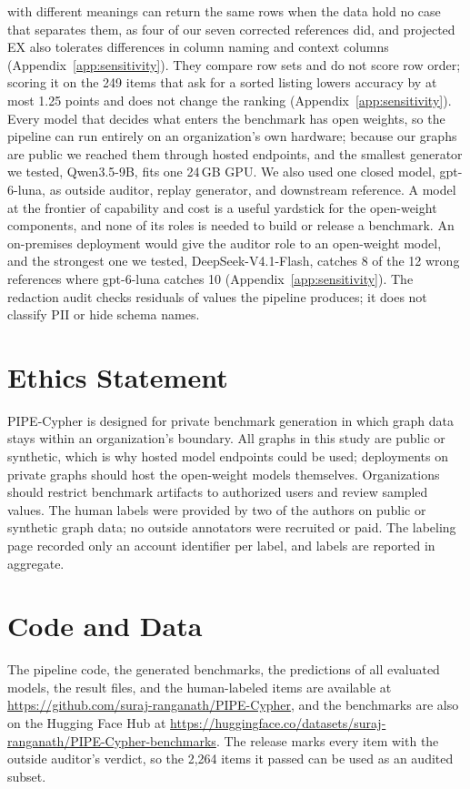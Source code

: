 \documentclass[11pt]{article}
\begin{document}
with different meanings can return the same rows when the data hold no case that separates them, as four of our seven corrected references did, and projected EX also tolerates differences in column naming and context columns (Appendix~\ref{app:sensitivity}). They compare row sets and do not score row order; scoring it on the 249 items that ask for a sorted listing lowers accuracy by at most 1.25 points and does not change the ranking (Appendix~\ref{app:sensitivity}). Every model that decides what enters the benchmark has open weights, so the pipeline can run entirely on an organization's own hardware; because our graphs are public we reached them through hosted endpoints, and the smallest generator we tested, Qwen3.5-9B, fits one 24\,GB GPU. We also used one closed model, gpt-6-luna, as outside auditor, replay generator, and downstream reference. A model at the frontier of capability and cost is a useful yardstick for the open-weight components, and none of its roles is needed to build or release a benchmark. An on-premises deployment would give the auditor role to an open-weight model, and the strongest one we tested, DeepSeek-V4.1-Flash, catches 8 of the 12 wrong references where gpt-6-luna catches 10 (Appendix~\ref{app:sensitivity}). The redaction audit checks residuals of values the pipeline produces; it does not classify PII or hide schema names.

\section*{Ethics Statement}
PIPE-Cypher is designed for private benchmark generation in which graph data stays within an organization's boundary. All graphs in this study are public or synthetic, which is why hosted model endpoints could be used; deployments on private graphs should host the open-weight models themselves. Organizations should restrict benchmark artifacts to authorized users and review sampled values. The human labels were provided by two of the authors on public or synthetic graph data; no outside annotators were recruited or paid. The labeling page recorded only an account identifier per label, and labels are reported in aggregate.

\section*{Code and Data}
The pipeline code, the generated benchmarks, the predictions of all evaluated models, the result files, and the human-labeled items are available at \url{https://github.com/suraj-ranganath/PIPE-Cypher}, and the benchmarks are also on the Hugging Face Hub at \url{https://huggingface.co/datasets/suraj-ranganath/PIPE-Cypher-benchmarks}. The release marks every item with the outside auditor's verdict, so the 2,264 items it passed can be used as an audited subset.
\end{document}
